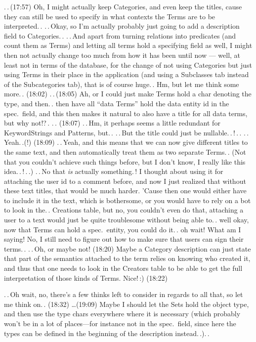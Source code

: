 \documentclass{report}
\begin{document}
.\,.\,(17:57) Oh, I might actually keep Categories, and even keep the titles, cause they can still be used to specify in what contexts the Terms are to be interpreted.\,. .\,.\,Okay, so I'm actually probably just going to add a description field to Categories.\,. .\,.\,And apart from turning relations into predicates (and count them as Terms) and letting all terms hold a specifying field as well, I might then not actually change too much from how it has been until now --- well, at least not in terms of the database, for the change of not using Categories but just using Terms in their place in the application (and using a Subclasses tab instead of the Subcategories tab), that is of course huge.\,. Hm, but let me think some more.\,. (18:02) .\,.\,(18:05) Ah, or I could just make Terms hold a char denoting the type, and then.\,. then have all ``data Terms'' hold the data entity id in the spec.\ field, and this then makes it natural to also have a title for all data terms, but why not!?\,. .\,. (18:07) .\,.\,Hm, it perhaps seems a little redundant for KeywordStrings and Patterns, but.\,. .\,.\,But the title could just be nullable.\,.\,!\,.\,. .\,.\,Yeah.\,.(!) (18:09) .\,.\,Yeah, and this means that we can now give different titles to the same text, and then automatically treat them as two separate Terms.\,. (Not that you couldn't achieve such things before, but I don't know, I really like this idea.\,.\,!\,.\,.) .\,.\,No that \emph{is} actually something.\,! I thought about using it for attaching the user id to a comment before, and now I just realized that without these text titles, that would be much harder. 'Cause then one would either have to include it in the text, which is bothersome, or you would have to rely on a bot to look in the.\,. Creations table, but no, you couldn't even do that, attaching a user to a text would just be quite troublesome without being able to.\,. well okay, now that Terms can hold a spec.\ entity, you could do it.\,. oh wait! What am I saying! No, I still need to figure out how to make sure that users can sign their terms.\,. .\,.\,Oh, or maybe not! (18:20) Maybe a Category description can just state that part of the semantics attached to the term relies on knowing who created it, and thus that one needs to look in the Creators table to be able to get the full interpretation of those kinds of Terms. Nice!\,:) (18:22)

.\,.\,Oh wait, no, there's a few thinks left to consider in regards to all that, so let me think on.\,. (18:32) \ldots (19:09) Maybe I should let the Sets hold the object type, and then use the type chars everywhere where it is necessary (which probably won't be in a lot of places---for instance not in the spec.\ field, since here the types can be defined in the beginning of the description instead.\,.).\,.
\end{document}
